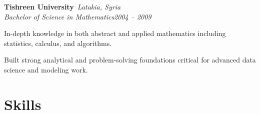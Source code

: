\documentclass[letterpaper,10pt]{article}
\newcommand{\heading}[2]{
  \hspace{0pt}#1\hfill#2\\
}
\newcommand{\headingBI}[2]{
  \heading{\textbf{#1}}{\textit{#2}}
}
\newcommand{\headingIt}[2]{
  \heading{\textit{#1}}{\textit{#2}}
}
\newenvironment{resume_list}{
  \vspace{-7pt}
  \begin{itemize}[itemsep=-2px, parsep=1pt, leftmargin=30pt]
}{
  \end{itemize}
}
\begin{document}
\vspace{5pt}
\begin{highlightbox}[colback=blue!10,sharp corners=south]
\headingBI{Tishreen University}{\textcolor{gray!90}
{\footnotesize \faMapMarker*~Latakia, Syria}}
\headingIt{Bachelor of Science in Mathematics}{\footnotesize 2004 -- 2009}
\end{highlightbox}
\begin{highlightbox}[bottom=0pt,sharp corners=north]\vspace{6pt}
\begin{resume_list}
  \item In-depth knowledge in both abstract and applied mathematics including statistics, calculus, and algorithms.
  \item Built strong analytical and problem-solving foundations critical for advanced data science and modeling work.
\end{resume_list}\end{highlightbox}
\vspace{5pt}

\section*{{\faDesktop} Skills}
\end{document}
